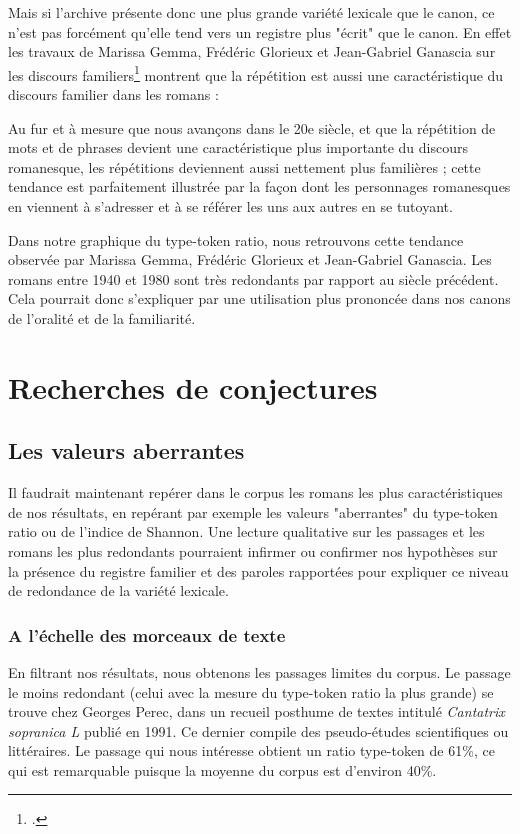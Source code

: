 \documentclass[a4paper,twoside,12pt]{book}
\begin{document}
Mais si l'archive présente donc une plus grande variété lexicale que le canon, ce n'est pas forcément qu'elle tend vers un registre plus "écrit" que le canon. En effet les travaux de Marissa Gemma, Frédéric Glorieux et Jean-Gabriel Ganascia sur les discours familiers\footcites{gemma_operationalizing_2015} montrent que la répétition est aussi une caractéristique du discours familier dans les romans :
\begin{displayquote}
 Au fur et à mesure que nous avançons dans le 20e siècle, et que la répétition de mots et de phrases devient une caractéristique plus importante du discours romanesque, les répétitions deviennent aussi nettement plus familières ; cette tendance est parfaitement illustrée par la façon dont les personnages romanesques en viennent à s'adresser et à se référer les uns aux autres en se tutoyant.
\end{displayquote}
Dans notre graphique du type-token ratio, nous retrouvons cette tendance observée par Marissa Gemma, Frédéric Glorieux et Jean-Gabriel Ganascia. Les romans entre 1940 et 1980 sont très redondants par rapport au siècle précédent. Cela pourrait donc s'expliquer par une utilisation plus prononcée dans nos canons de l'oralité et de la familiarité.

\chapter{Recherches de conjectures}

\section{Les valeurs aberrantes}

Il faudrait maintenant repérer dans le corpus les romans les plus caractéristiques de nos résultats, en repérant par exemple les valeurs "aberrantes" du type-token ratio ou de l'indice de Shannon. Une lecture qualitative sur les passages et les romans les plus redondants pourraient infirmer ou confirmer nos hypothèses sur la présence du registre familier et des paroles rapportées pour expliquer ce niveau de redondance de la variété lexicale. 

\subsection{A l'échelle des morceaux de texte}
En filtrant nos résultats, nous obtenons les passages limites du corpus. 
Le passage le moins redondant (celui avec la mesure du type-token ratio la plus grande) se trouve chez Georges Perec, dans un recueil posthume de textes intitulé \og\textit{Cantatrix sopranica L}\fg{} publié en 1991. Ce dernier compile des pseudo-études scientifiques ou littéraires. Le passage qui nous intéresse obtient un ratio type-token de 61\%, ce qui est remarquable puisque la moyenne du corpus est d'environ 40\%.
\end{document}
